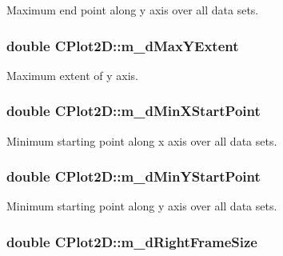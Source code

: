 Maximum end point along y axis over all data sets. \hypertarget{class_c_plot2_d_ab706fb5496f0efc22a6e249b8f8098e1}{
\subsubsection[{m\-\_\-d\-Max\-Y\-Extent}]{\setlength{\rightskip}{0pt plus 5cm}double C\-Plot2\-D\-::m\-\_\-d\-Max\-Y\-Extent\hspace{0.3cm}{\ttfamily [protected]}}}\label{class_c_plot2_d_ab706fb5496f0efc22a6e249b8f8098e1}
Maximum extent of y axis. \hypertarget{class_c_plot2_d_af493194c036470eec222e8ba94a5807e}{
\subsubsection[{m\-\_\-d\-Min\-X\-Start\-Point}]{\setlength{\rightskip}{0pt plus 5cm}double C\-Plot2\-D\-::m\-\_\-d\-Min\-X\-Start\-Point\hspace{0.3cm}{\ttfamily [protected]}}}\label{class_c_plot2_d_af493194c036470eec222e8ba94a5807e}
Minimum starting point along x axis over all data sets. \hypertarget{class_c_plot2_d_a1a9960282bd4b25fda3f37229e42ec30}{
\subsubsection[{m\-\_\-d\-Min\-Y\-Start\-Point}]{\setlength{\rightskip}{0pt plus 5cm}double C\-Plot2\-D\-::m\-\_\-d\-Min\-Y\-Start\-Point\hspace{0.3cm}{\ttfamily [protected]}}}\label{class_c_plot2_d_a1a9960282bd4b25fda3f37229e42ec30}
Minimum starting point along y axis over all data sets. \hypertarget{class_c_plot2_d_a9b6aaeeb92dd7e9305baeec0cdf3e63c}{
\subsubsection[{m\-\_\-d\-Right\-Frame\-Size}]{\setlength{\rightskip}{0pt plus 5cm}double C\-Plot2\-D\-::m\-\_\-d\-Right\-Frame\-Size\hspace{0.3cm}{\ttfamily [protected]}}}\label{class_c_plot2_d_a9b6aaeeb92dd7e9305baeec0cdf3e63c}
